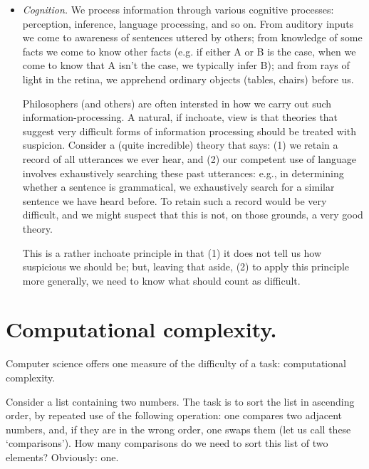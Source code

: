 \begin{itemize}
    \item \emph{Cognition.} We process information through various cognitive processes: perception, inference, language processing, and so on. From auditory inputs we come to awareness of sentences uttered by others; from knowledge of some facts we come to know other facts (e.g. if either A or B is the case, when we come to know that A isn’t the case, we typically infer B); and from rays of light in the retina, we apprehend ordinary objects (tables, chairs) before us.

    Philosophers (and others) are often intersted in how we carry out such information-processing. A natural, if inchoate, view is that theories that suggest very difficult forms of information processing should be treated with suspicion. Consider a (quite incredible) theory that says: (1) we retain a record of all utterances we ever hear, and (2) our competent use of language involves exhaustively searching these past utterances: e.g., in determining whether a sentence is grammatical, we exhaustively search for a similar sentence we have heard before. To retain such a record would be very difficult, and we might suspect that this is not, on those grounds, a very good theory.
    
    This is a rather inchoate principle in that (1) it does not tell us how suspicious we should be; but, leaving that aside, (2) to apply this principle more generally, we need to know what should count as difficult.
\end{itemize}
\section*{Computational complexity.}
Computer science offers one measure of the difficulty of a task: computational complexity.

Consider a list containing two numbers. The task is to sort the list in ascending order, by repeated use of the following operation: one compares two adjacent numbers, and, if they are in the wrong order, one swaps them (let us call these ‘comparisons’). How many comparisons do we need to sort this list of two elements? Obviously: one.


